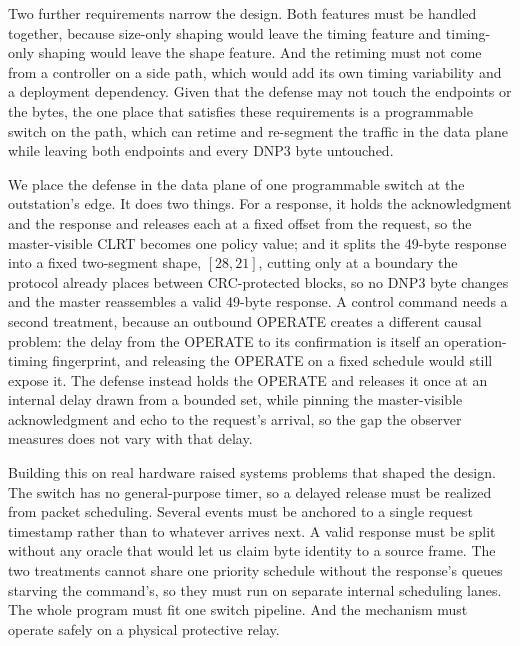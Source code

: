 \documentclass[conference]{IEEEtran}
\begin{document}
Two further requirements narrow the design. Both features must be handled together, because size-only
shaping would leave the timing feature and timing-only shaping would leave the shape feature. And the
retiming must not come from a controller on a side path, which would add its own timing variability and
a deployment dependency. Given that the defense may not touch the endpoints or the bytes, the one place
that satisfies these requirements is a programmable switch on the path, which can retime and re-segment
the traffic in the data plane while leaving both endpoints and every DNP3 byte untouched.

We place the defense in the data plane of one programmable switch at the outstation's edge. It does
two things. For a response, it holds the acknowledgment and the response and releases each at a fixed
offset from the request, so the master-visible CLRT becomes one policy value; and it splits the
49-byte response into a fixed two-segment shape, $[28,21]$, cutting only at a boundary the protocol
already places between CRC-protected blocks, so no DNP3 byte changes and the master reassembles a
valid 49-byte response. A control command needs a second treatment, because an outbound OPERATE
creates a different causal problem: the delay from the OPERATE to its confirmation is itself an
operation-timing fingerprint, and releasing the OPERATE on a fixed schedule would still expose
it. The defense instead holds the OPERATE and releases it once at an internal delay drawn from a
bounded set, while pinning the master-visible acknowledgment and echo to the request's arrival, so the
gap the observer measures does not vary with that delay.

Building this on real hardware raised systems problems that shaped the design. The switch has no
general-purpose timer, so a delayed release must be realized from packet scheduling. Several events
must be anchored to a single request timestamp rather than to whatever arrives next. A valid response
must be split without any oracle that would let us claim byte identity to a source frame. The two
treatments cannot share one priority schedule without the response's queues starving the command's,
so they must run on separate internal scheduling lanes. The whole program must fit one switch
pipeline. And the mechanism must operate safely on a physical protective relay.
\end{document}
